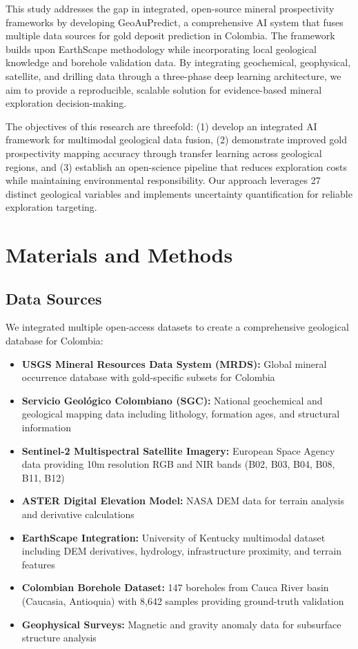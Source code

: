 \documentclass[12pt,a4paper]{article}
\begin{document}
This study addresses the gap in integrated, open-source mineral prospectivity frameworks by developing GeoAuPredict, a comprehensive AI system that fuses multiple data sources for gold deposit prediction in Colombia. The framework builds upon EarthScape methodology while incorporating local geological knowledge and borehole validation data. By integrating geochemical, geophysical, satellite, and drilling data through a three-phase deep learning architecture, we aim to provide a reproducible, scalable solution for evidence-based mineral exploration decision-making.

The objectives of this research are threefold: (1) develop an integrated AI framework for multimodal geological data fusion, (2) demonstrate improved gold prospectivity mapping accuracy through transfer learning across geological regions, and (3) establish an open-science pipeline that reduces exploration costs while maintaining environmental responsibility. Our approach leverages 27 distinct geological variables and implements uncertainty quantification for reliable exploration targeting.

\section{Materials and Methods}

\subsection{Data Sources}
We integrated multiple open-access datasets to create a comprehensive geological database for Colombia:

\begin{itemize}
    \item \textbf{USGS Mineral Resources Data System (MRDS):} Global mineral occurrence database with gold-specific subsets for Colombia
    \item \textbf{Servicio Geológico Colombiano (SGC):} National geochemical and geological mapping data including lithology, formation ages, and structural information
    \item \textbf{Sentinel-2 Multispectral Satellite Imagery:} European Space Agency data providing 10m resolution RGB and NIR bands (B02, B03, B04, B08, B11, B12)
    \item \textbf{ASTER Digital Elevation Model:} NASA DEM data for terrain analysis and derivative calculations
    \item \textbf{EarthScape Integration:} University of Kentucky multimodal dataset including DEM derivatives, hydrology, infrastructure proximity, and terrain features
    \item \textbf{Colombian Borehole Dataset:} 147 boreholes from Cauca River basin (Caucasia, Antioquia) with 8,642 samples providing ground-truth validation
    \item \textbf{Geophysical Surveys:} Magnetic and gravity anomaly data for subsurface structure analysis
\end{itemize}
\end{document}
